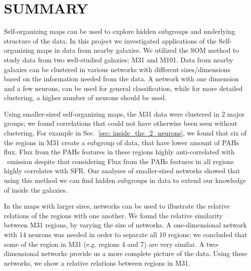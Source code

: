\section{SUMMARY}
\label{sec: summary}
Self-organizing maps can be used to explore hidden subgroups and underlying structure of the data.
In this project we investigated applications of the Self-organizing maps in data from nearby galaxies.
We utilized the SOM method to study data from two well-studied galaxies; M31 and M101.
Data from nearby galaxies can be clustered in various networks with different sizes/dimensions based on the information needed from the data. 
A network with one dimension and a few neurons, can be used for general classification, while for more detailed clustering, a higher number of neurons should be used.

Using smaller-sized self-organizing maps, the M31 data were clustered in 2 major groups; we found correlations that could not have otherwise been seen without clustering.
For example in Sec.~\ref{sec: inside_the_2_neurons}, we found that six of the regions in M31 create a subgroup of data, that have lower amount of PAHs flux.
Flux from the PAHs features in these regions highly anti-correlated with \halpha~emission despite that considering Flux from the PAHs features in all regions highly correlates with SFR.
Our analyses of smaller-sized networks showed that using this method we can find hidden subgroups in data to extend our knowledge of inside the galaxies.

In the maps with larger sizes, networks can be used to illustrate the relative relations of the regions with one another.
We found the relative similarity between M31 regions, by varying the size of networks.
A one-dimensional network with 14 neurons was needed in order to
separate all 10 regions; we concluded that some of the region in M31 (e.g. regions 4 and 7) are very similar.
A two-dimensional networks provide us a more complete picture of the data.
Using these networks, we show a relative relations between regions in M31.

